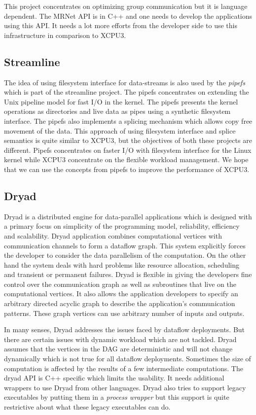 This project concentrates on optimizing group communication but it is language
dependent.  The MRNet API is in C++ and one needs to develop the applications
using this API. It needs a lot more efforts from the developer side to use this
infrastructure in comparison to XCPU3.


\subsection{Streamline}
The idea of using filesystem interface for data-streams is also used by the
\textit{pipefs}\cite{1400104} which is part of the streamline\cite{streamline}
project.  The pipefs concentrates on extending the Unix pipeline model for fast
I/O in the kernel. The pipefs presents the kernel operations as directories and
live data as pipes using a synthetic filesystem interface.  The pipefs also
implements a splicing mechanism which allows copy free movement of the data. 
This approach of using filesystem interface and splice semantics is quite
similar to XCPU3, but the objectives of both these projects are different. 
Pipefs concentrates on faster I/O with filesystem interface for the Linux
kernel while XCPU3 concentrate on the flexible workload management.  We hope
that we can use the concepts from pipefs to improve the performance of XCPU3.


\subsection{Dryad}
Dryad\cite{yu2008dsg} is a distributed engine for data-parallel applications
which is designed with a primary focus on simplicity of the programming model,
reliability, efficiency and scalability.  Dryad application combines
computational vertices with communication channels to form a dataflow graph. 
This system explicitly forces the developer to consider the data parallelism of
the computation. On the other hand the system deals with hard problems like
resource allocation, scheduling and transient or permanent failures.  Dryad is
flexible in giving the developers fine control over the communication graph as
well as subroutines that live on the computational vertices. It also allows the
application developers to specify an arbitrary directed acyclic graph to
describe the application's communication patterns.  These graph vertices can use
arbitrary number of inputs and outputs.

In many senses, Dryad addresses the issues faced by dataflow deployments.
But there are certain issues with dynamic workload which are not tackled.  Dryad
assumes that the vertices in the DAG are deterministic and will not change
dynamically which is not true for all dataflow deployments.  Sometimes the size
of computation is affected by the results of a few intermediate computations. 
The dryad API is C++ specific which limits the usability. It needs additional
wrappers to use Dryad from other languages.  Dryad also tries to support legacy
executables by putting them in a \textit{process wrapper} but this support is
quite restrictive about what these legacy executables can do.

